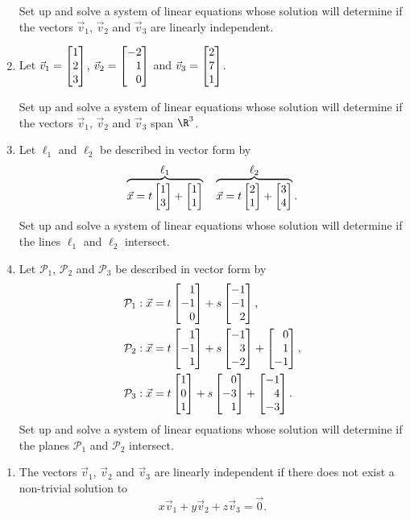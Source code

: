 \begin{exercises}
\begin{problist}
\begin{enumerate}
			Set up and solve a system of linear equations whose solution
			will determine if the vectors $\vec v_{1}$, $\vec v_{2}$ and $\vec
			v_{3}$ are linearly independent.
			
			\item Let $\vec v_{1}=\mat{1\\2\\3}$, $\vec v_{2}=\mat{-2\\1\\0}$
			and $\vec v_{3}=\mat{2\\7\\1}$.
			
			Set up and solve a system of linear equations whose solution
			will determine if the vectors $\vec v_{1}$, $\vec v_{2}$ and $\vec
			v_{3}$ span $\R^{3}$.
			\item Let $\ell_1$ and $\ell_2$ be described in vector form by
			\[
				\overbrace{\vec x=t\mat{1\\3}+\mat{1\\1}}^{\displaystyle \ell_1}
				\quad
				\overbrace{\vec x=t\mat{2\\1}+\mat{3\\4}}^{\displaystyle \ell_2}.
			\]
			Set up and solve a system of linear equations whose solution will
			determine if the lines $\ell_{1}$ and $\ell_{2}$ intersect.
			\item Let $\mathcal{P}_{1}$, $\mathcal{P}_{2}$ and $\mathcal{P}_{3}$
			be described in vector form by
			\[
				\begin{aligned}
					&\mathcal{P}_1: \vec x=t\mat{1\\-1\\0}+s\mat{-1\\-1\\2},\\
					&\mathcal{P}_2: \vec x=t\mat{1\\-1\\1}+s\mat{-1\\3\\-2}+\mat{0\\1\\-1},\\
					&\mathcal{P}_3: \vec x=t\mat{1\\0\\1}+s\mat{0\\-3\\1}+\mat{-1\\4\\-3}.
				\end{aligned}
			\]
			Set up and solve a system of linear equations whose solution
			will determine if the planes $\mathcal{P}_{1}$ and
			$\mathcal{P}_{2}$ intersect.
		\end{enumerate}
		\begin{solution}
			\begin{enumerate}
				\item The vectors $\vec v_{1}$, $\vec v_{2}$ and $\vec v_{3}$
				are linearly independent if there does not exist a non-trivial
				solution to
				\[
					x\vec v_1+y\vec v_2+z\vec v_3=\vec 0.
				\]
				

\end{enumerate}
\end{solution}
\end{problist}
\end{exercises}
